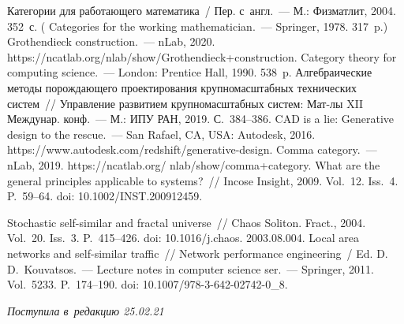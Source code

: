 \begin{multicols}{2}
{{\begin{thebibliography}{99}
 Категории для работающего математика~/ Пер. с~англ.~--- М.: Физматлит, 
2004. 352~с. ( Categories for the working mathematician.~--- Springer, 1978. 
317~p.)
Grothendieck construction.~--- nLab, 2020. {\sf 
https://\linebreak ncatlab.org/nlab/show/Grothendieck+construction}.
 Category theory for computing science.~--- London: Prentice Hall, 1990. 
538~p.
 Алгебраические методы порождающего проектирования 
крупномасштабных технических сис\-тем~// Управ\-ле\-ние развитием крупномасштабных 
систем: Мат-лы XII Междунар. конф.~--- М.: ИПУ РАН, 2019. С.~384--386.
 CAD is a lie: Generative design to the rescue.~--- San Rafael, CA, USA: 
Autodesk, 2016. {\sf https://www.autodesk.com/redshift/generative-design}.
Comma category.~--- nLab, 2019. {\sf https://ncatlab.org/ nlab/show/comma+category}.
    What are the general principles applicable to systems?~// Incose Insight, 
2009. Vol.~12. Iss.~4. P.~59--64. doi: 10.1002/INST.200912459.

 Stochastic self-similar and fractal universe~// 
Chaos Soliton. Fract., 2004. Vol.~20. Iss.~3. P.~415--426. doi: 10.1016/j.chaos. 2003.08.004.
    Local area networks and self-similar traffic~// Network performance 
engineering~/ Ed. D.\,D.~Kouvatsos.~--- Lecture notes in computer science ser.~--- Springer, 2011. 
Vol.~5233. P.~174--190. doi: 10.1007/978-3-642-02742-0\_8.
\end{thebibliography}

 }
 }

\end{multicols}

\vspace*{-9pt}

\hfill{\small\textit{Поступила в~редакцию 25.02.21}}



\newpage

\vspace*{-28pt}




